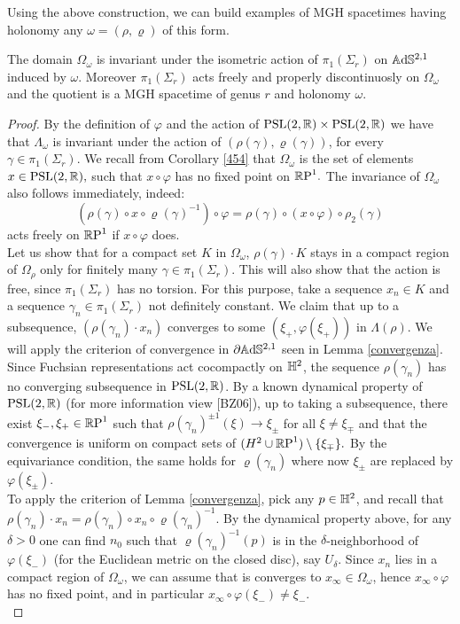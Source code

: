Using the above construction, we can build examples of MGH spacetimes having holonomy any $\omega=(\rho,\varrho)$ of this form. 

\begin{proposition}\label{examplesgenustwo}
    The domain $\Omega_\omega$ is invariant under the isometric action of $\pi_1(\Sigma_r)$ on $\A^{2,1}$ induced by $\omega.$ Moreover $\pi_1(\Sigma_r)$ acts freely and properly discontinuosly on $\Omega_\omega$ and the quotient is a MGH spacetime of genus $r$ and holonomy $\omega.$ 
\end{proposition}
\begin{proof}
    By the definition of $\varphi$ and the action of $\PSL\times\PSL$ we have that $\Lambda_\omega$ is invariant under the action of $(\rho(\gamma),\varrho(\gamma))$, for every $\gamma\in\pi_1(\Sigma_r).$ We recall from Corollary \ref{454} that $\Omega_\omega$ is the set of elements $x\in\PSL,$ such that $x\circ\varphi$ has no fixed point on $\S.$ The invariance of $\Omega_\omega$ also follows immediately, indeed: 
    \[
        (\rho(\gamma)\circ x\circ \varrho(\gamma)^{-1})\circ \varphi = \rho(\gamma)\circ (x\circ\varphi)\circ\rho_2(\gamma)
    \]
    acts freely on $\S$ if $x\circ\varphi$ does. \\
    Let us show that for a compact set $K$ in $\Omega_\omega$, $\rho(\gamma)\cdot K$ stays in a compact region of $\Omega_{\rho}$ only for finitely many $\gamma\in\pi_1(\Sigma_r).$  This will also show that the action is free, since $\pi_1(\Sigma_r)$ has no torsion. For this purpose, take a sequence $x_n\in K$ and a sequence $\gamma_n\in \pi_1(\Sigma_r)$ not definitely constant. We claim that up to a subsequence, $(\rho(\gamma_n)\cdot x_n)$ converges to some $(\xi_+,\varphi(\xi_+))$ in $\Lambda(\rho).$ We will apply the criterion of convergence in $\partial\A^{2,1}$ seen in Lemma \ref{convergenza}.\\
    Since Fuchsian representations act cocompactly on $\H^2$, the sequence $\rho(\gamma_n)$ has no converging subsequence in $\PSL$. By a known dynamical property of $\PSL$ (for more information view [BZ06]), up to taking a subsequence, there exist $\xi_-,\xi_+\in\S$ such that $\rho(\gamma_n)^{\pm 1}(\xi)\to\xi_{\pm}$ for all $\xi\neq \xi_{\mp}$ and that the convergence is uniform on compact sets of $(H^2\cup\S)\setminus\{\xi_{\mp}\}.$ By the equivariance condition, the same holds for $\varrho(\gamma_n)$ where now $\xi_\pm$ are replaced by $\varphi(\xi_\pm).$\\
    To apply the criterion of Lemma \ref{convergenza}, pick any $p\in\H^2$, and recall that $\rho(\gamma_n)\cdot x_n=\rho(\gamma_n)\circ x_n\circ \varrho(\gamma_n)^{-1}.$ By the dynamical property above, for any $\delta>0$ one can find $n_0$ such that $\varrho(\gamma_{n})^{-1}(p)$ is in the $\delta$-neighborhood of $\varphi(\xi_-)$ (for the Euclidean metric on the closed disc), say $U_\delta$. Since $x_n$ lies in a compact region of $\Omega_\omega$, we can assume that is converges to $x_\infty \in \Omega_\omega$, hence $x_\infty\circ\varphi$ has no fixed point, and in particular $x_\infty\circ\varphi(\xi_-)\neq \xi_-.$\\

\end{proof}
